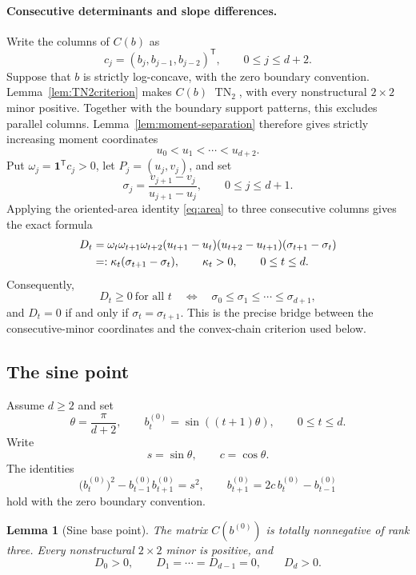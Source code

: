 \documentclass{amsart}
\numberwithin{equation}{section}
\newtheorem{lemma}[theorem]{Lemma}
\theoremstyle{definition}
\theoremstyle{remark}
\DeclareMathOperator{\TN}{TN}
\newcommand{\transpose}{\mathsf T}
\begin{document}
\paragraph{Consecutive determinants and slope differences.}
Write the columns of $C(b)$ as
\[
 c_j=(b_j,b_{j-1},b_{j-2})^{\transpose},
 \qquad 0\le j\le d+2.
\]
Suppose that $b$ is strictly log-concave, with the zero boundary convention.  Lemma~\ref{lem:TN2criterion} makes $C(b)$ $\TN_2$, with every nonstructural $2\times2$ minor positive.  Together with the boundary support patterns, this excludes parallel columns.  Lemma~\ref{lem:moment-separation} therefore gives strictly increasing moment coordinates
\[
 u_0<u_1<\cdots<u_{d+2}.
\]
Put $\omega_j=\mathbf1^{\transpose}c_j>0$, let $P_j=(u_j,v_j)$, and set
\[
 \sigma_j=\frac{v_{j+1}-v_j}{u_{j+1}-u_j},
 \qquad 0\le j\le d+1.
\]
Applying the oriented-area identity \eqref{eq:area} to three consecutive columns gives the exact formula
\begin{align}
 D_t
 &={}\omega_t\omega_{t+1}\omega_{t+2}
 (u_{t+1}-u_t)(u_{t+2}-u_{t+1})
 (\sigma_{t+1}-\sigma_t)\notag\\
 &=:\kappa_t(\sigma_{t+1}-\sigma_t),
 \qquad \kappa_t>0,
 \qquad 0\le t\le d.\label{eq:D-slope}
\end{align}
Consequently,
\[
 D_t\ge0\ \text{for all }t
 \quad\Longleftrightarrow\quad
 \sigma_0\le\sigma_1\le\cdots\le\sigma_{d+1},
\]
and $D_t=0$ if and only if $\sigma_t=\sigma_{t+1}$.  This is the precise bridge between the consecutive-minor coordinates and the convex-chain criterion used below.

\subsection*{The sine point}
Assume $d\ge2$ and set
\begin{equation}\label{eq:sinebase}
 \theta=\frac{\pi}{d+2},
 \qquad
 b_t^{(0)}=\sin((t+1)\theta),
 \qquad 0\le t\le d.
\end{equation}
Write
\begin{equation}\label{eq:sc}
 s=\sin\theta,
 \qquad c=\cos\theta.
\end{equation}
The identities
\begin{equation}\label{eq:sineidentities}
 \bigl(b_t^{(0)}\bigr)^2-b_{t-1}^{(0)}b_{t+1}^{(0)}=s^2,
 \qquad
 b_{t+1}^{(0)}=2c\,b_t^{(0)}-b_{t-1}^{(0)}
\end{equation}
hold with the zero boundary convention.

\begin{lemma}[Sine base point]\label{lem:sinebase}
The matrix $C(b^{(0)})$ is totally nonnegative of rank three.  Every nonstructural $2\times2$ minor is positive, and
\begin{equation}\label{eq:sineD}
 D_0>0,
 \qquad
 D_1=\cdots=D_{d-1}=0,
 \qquad
 D_d>0.
\end{equation}
\end{lemma}
\end{document}
